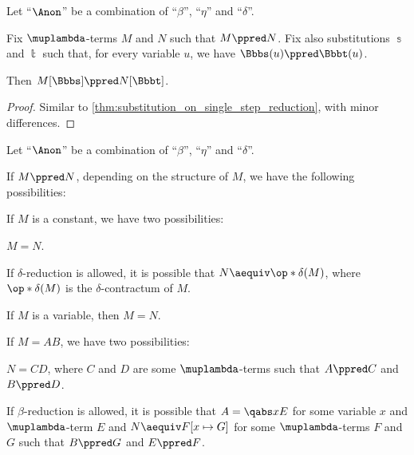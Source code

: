 \begin{proposition}\label{thm:substitution_on_parallel_reduction}
  Let \enquote{\( {\Anon} \)} be a combination of \enquote{\( \beta \)}, \enquote{\( \eta \)} and \enquote{\( \delta \)}.

  Fix \( \muplambda \)-terms \( M \) and \( N \) such that \( M \ppred N \). Fix also substitutions \( \Bbbs \) and \( \Bbbt \) such that, for every variable \( u \), we have \( \Bbbs(u) \ppred \Bbbt(u) \).

  Then \( M[\Bbbs] \ppred N[\Bbbt] \).
\end{proposition}
\begin{proof}
  Similar to \cref{thm:substitution_on_single_step_reduction}, with minor differences.
\end{proof}

\begin{lemma}\label{thm:parallel_reduction_deconstruction}
  Let \enquote{\( {\Anon} \)} be a combination of \enquote{\( \beta \)}, \enquote{\( \eta \)} and \enquote{\( \delta \)}.

  If \( M \ppred N \), depending on the structure of \( M \), we have the following possibilities:
  \begin{thmenum}
     If \( M \) is a constant, we have two possibilities:
    \begin{thmenum}
       \( M = N \).

       If \( \delta \)-reduction is allowed, it is possible that \( N \aequiv \op*{\delta}(M) \), where \( \op*{\delta}(M) \) is the \( \delta \)-contractum  of \( M \).
    \end{thmenum}

     If \( M \) is a variable, then \( M = N \).

     If \( M = AB \), we have two possibilities:
    \begin{thmenum}
       \( N = CD \), where \( C \) and \( D \) are some \( \muplambda \)-terms such that \( A \ppred C \) and \( B \ppred D \).

       If \( \beta \)-reduction is allowed, it is possible that \( A = \qabs x E \) for some variable \( x \) and \( \muplambda \)-term \( E \) and \( N \aequiv F[x \mapsto G] \) for some \( \muplambda \)-terms \( F \) and \( G \) such that \( B \ppred G \) and \( E \ppred F \).
    \end{thmenum}


\end{thmenum}
\end{lemma}
